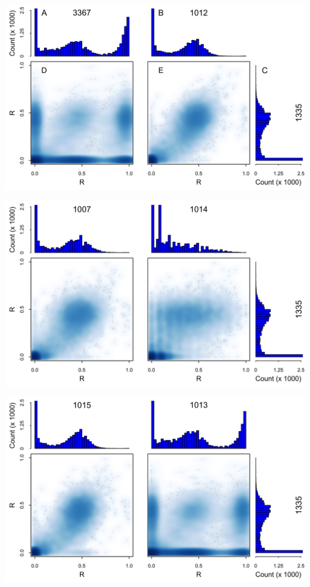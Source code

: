 \documentclass{article}\usepackage[]{graphicx}\usepackage[]{color}
\begin{document}
\noindent\includegraphics[width=\linewidth]{Fig1-mscat-figs/mscat-6-2-7.jpg}

\noindent\includegraphics[width=\linewidth]{Fig1-mscat-figs/mscat-1-4-7.jpg}

\noindent\includegraphics[width=\linewidth]{Fig1-mscat-figs/mscat-5-3-7.jpg}
\end{document}
